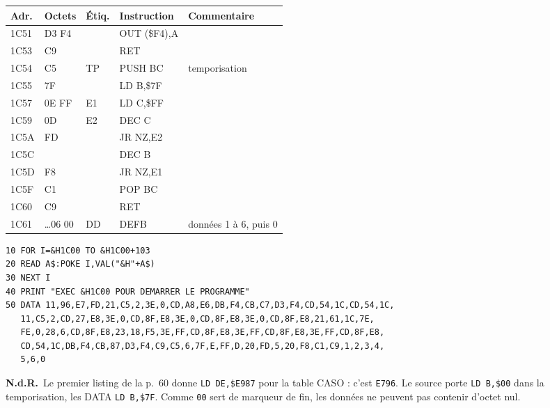 \documentclass[a4paper,10pt]{article}
\makeatletter
\newcommand{\hex}[1]{\texttt{#1}}
\newcommand{\nota}[1]{\textcolor{red!60!black}{\small\textbf{N.d.R.}~#1}}
\newenvironment{asm}
  {\small\begin{longtable}{@{}>{\ttfamily}l>{\ttfamily}l>{\ttfamily}l>{\ttfamily}l>{\raggedright\arraybackslash}p{6.2cm}@{}}
   \toprule
   \normalfont\bfseries Adr. & \normalfont\bfseries Octets & \normalfont\bfseries Étiq. & \normalfont\bfseries Instruction & \textbf{Commentaire}\\
   \midrule\endhead
   \bottomrule\endfoot}
  {\end{longtable}}
\makeatother
\begin{document}
\begin{asm}
1C51 & D3 F4    & & OUT (\$F4),A   & \\
1C53 & C9       & & RET            & \\
1C54 & C5       & TP & PUSH BC     & temporisation \\
1C55 & 06 7F    & & LD B,\$7F      & \\
1C57 & 0E FF    & E1 & LD C,\$FF   & \\
1C59 & 0D       & E2 & DEC C       & \\
1C5A & 20 FD    & & JR NZ,E2       & \\
1C5C & 05       & & DEC B          & \\
1C5D & 20 F8    & & JR NZ,E1       & \\
1C5F & C1       & & POP BC         & \\
1C60 & C9       & & RET            & \\
1C61 & 01 \dots 06 00 & DD & DEFB    & données 1 à 6, puis 0 \\
\end{asm}
\begin{verbatim}
10 FOR I=&H1C00 TO &H1C00+103
20 READ A$:POKE I,VAL("&H"+A$)
30 NEXT I
40 PRINT "EXEC &H1C00 POUR DEMARRER LE PROGRAMME"
50 DATA 11,96,E7,FD,21,C5,2,3E,0,CD,A8,E6,DB,F4,CB,C7,D3,F4,CD,54,1C,CD,54,1C,
   11,C5,2,CD,27,E8,3E,0,CD,8F,E8,3E,0,CD,8F,E8,3E,0,CD,8F,E8,21,61,1C,7E,
   FE,0,28,6,CD,8F,E8,23,18,F5,3E,FF,CD,8F,E8,3E,FF,CD,8F,E8,3E,FF,CD,8F,E8,
   CD,54,1C,DB,F4,CB,87,D3,F4,C9,C5,6,7F,E,FF,D,20,FD,5,20,F8,C1,C9,1,2,3,4,
   5,6,0
\end{verbatim}
\nota{Le premier listing de la p.~60 donne \texttt{LD DE,\$E987} pour la
table CASO : c'est \hex{E796}. Le source porte \texttt{LD B,\$00} dans la
temporisation, les DATA \texttt{LD B,\$7F}. Comme \hex{00} sert de marqueur
de fin, les données ne peuvent pas contenir d'octet nul.}
\end{document}
